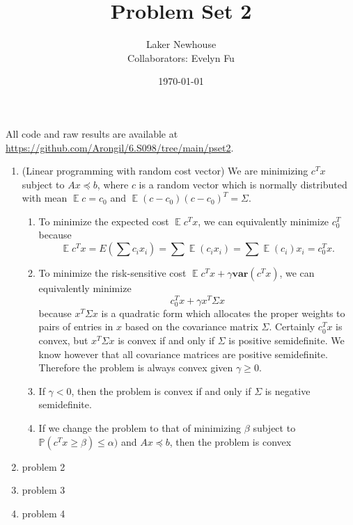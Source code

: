 \documentclass{article}
\title{Problem Set 2}
\author{Laker Newhouse\\Collaborators: Evelyn Fu}
\date{\today}
\renewcommand{\P}{\mathbb{P}}
\DeclareMathOperator{\E}{\mathbb{E}}
\begin{document}
\maketitle	

All code and raw results are available at \url{https://github.com/Arongil/6.S098/tree/main/pset2}.
\begin{enumerate}
    \item (Linear programming with random cost vector) We are minimizing $c^T x$ subject to $Ax \preceq b$, where $c$ is a random vector which is normally distributed with mean $\E c = c_0$ and $\E(c - c_0)(c - c_0)^T = \Sigma$. \begin{enumerate}
        \item To minimize the expected cost $\E c^T x$, we can equivalently minimize $c_0^T$ because \[
            \E c^T x = E \left( \sum c_i x_i \right) = \sum \E(c_i x_i) = \sum \E(c_i) x_i = c_0^T x.    
        \]
        \item To minimize the risk-sensitive cost $\E c^T x + \gamma \mathbf{var}(c^T x)$, we can equivalently minimize \[
            c_0^T x + \gamma x^T \Sigma x
        \] because $x^T \Sigma x$ is a quadratic form which allocates the proper weights to pairs of entries in $x$ based on the covariance matrix $\Sigma$. Certainly $c_0^T x$ is convex, but $x^T \Sigma x$ is convex if and only if $\Sigma$ is positive semidefinite. We know however that all covariance matrices are positive semidefinite. Therefore the problem is always convex given $\gamma \geq 0$.
        \item If $\gamma < 0$, then the problem is convex if and only if $\Sigma$ is negative semidefinite.
        \item If we change the problem to that of minimizing $\beta$ subject to $\P(c^T x \geq \beta) \leq \alpha)$ and $Ax \preceq b$, then the problem is convex 
    \end{enumerate}

    \item problem 2

    \item problem 3

    \item problem 4
\end{enumerate}
\end{document}
